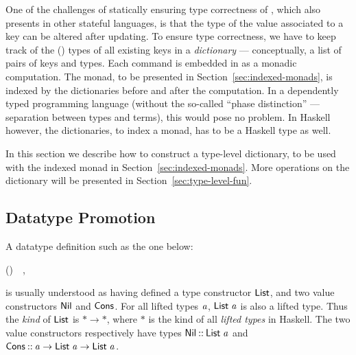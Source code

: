 One of the challenges of statically ensuring type correctness of \Redis{},
which also presents in other stateful languages, is that the type of the value
associated to a key can be altered after updating. To ensure type correctness,
we have to keep track of the (\Redis{}) types of all existing keys in a
{\em dictionary} --- conceptually, a list of pairs of keys and \Redis{} types.
Each \Redis{} command is embedded in \Popcorn{} as a monadic computation. The
monad, to be presented in Section~\ref{sec:indexed-monads}, is indexed by
the dictionaries before and after the computation. In a dependently typed
programming language (without the so-called ``phase distinction'' ---
separation between types and terms), this would pose no problem. In Haskell
however, the dictionaries, to index a monad, has to be a Haskell type as well.

In this section we describe how to construct a type-level dictionary, to be
used with the indexed monad in Section~\ref{sec:indexed-monads}. More operations
on the dictionary will be presented in Section~\ref{sec:type-level-fun}.

\subsection{Datatype Promotion}

%
%

A datatype definition such as the one below:
\begin{hscode}\SaveRestoreHook
{}%
%
\>[B]{}\;\;\mathrel{=}\mid {}\;\;(\;)~~,{}\<[E]%
\ColumnHook
\end{hscode}\resethooks
is usually understood as having defined a type constructor \ensuremath{\Conid{List}}, and two value
constructors \ensuremath{\Conid{Nil}} and \ensuremath{\Conid{Cons}}. For all lifted types \ensuremath{\Varid{a}}, \ensuremath{\Conid{List}\;\Varid{a}} is also a
lifted type. Thus the {\em kind} of \ensuremath{\Conid{List}} is \ensuremath{\mathbin{*}\to \mathbin{*}}, where \ensuremath{\mathbin{*}} is the kind of
all {\em lifted types} in Haskell. The two value constructors respectively
have types \ensuremath{\Conid{Nil}\mathbin{::}\Conid{List}\;\Varid{a}} and \ensuremath{\Conid{Cons}\mathbin{::}\Varid{a}\to \Conid{List}\;\Varid{a}\to \Conid{List}\;\Varid{a}}.

